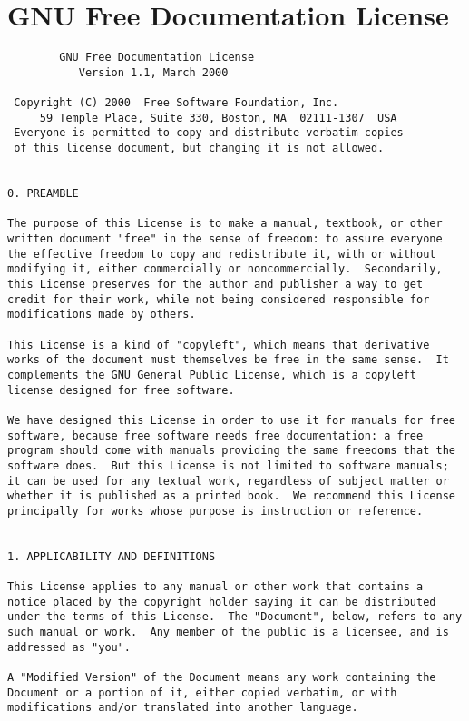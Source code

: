 \documentclass[12pt]{article}
\begin{document}
\newpage

\section{GNU Free Documentation License}

\begin{verbatim}
		GNU Free Documentation License
		   Version 1.1, March 2000

 Copyright (C) 2000  Free Software Foundation, Inc.
     59 Temple Place, Suite 330, Boston, MA  02111-1307  USA
 Everyone is permitted to copy and distribute verbatim copies
 of this license document, but changing it is not allowed.


0. PREAMBLE

The purpose of this License is to make a manual, textbook, or other
written document "free" in the sense of freedom: to assure everyone
the effective freedom to copy and redistribute it, with or without
modifying it, either commercially or noncommercially.  Secondarily,
this License preserves for the author and publisher a way to get
credit for their work, while not being considered responsible for
modifications made by others.

This License is a kind of "copyleft", which means that derivative
works of the document must themselves be free in the same sense.  It
complements the GNU General Public License, which is a copyleft
license designed for free software.

We have designed this License in order to use it for manuals for free
software, because free software needs free documentation: a free
program should come with manuals providing the same freedoms that the
software does.  But this License is not limited to software manuals;
it can be used for any textual work, regardless of subject matter or
whether it is published as a printed book.  We recommend this License
principally for works whose purpose is instruction or reference.


1. APPLICABILITY AND DEFINITIONS

This License applies to any manual or other work that contains a
notice placed by the copyright holder saying it can be distributed
under the terms of this License.  The "Document", below, refers to any
such manual or work.  Any member of the public is a licensee, and is
addressed as "you".

A "Modified Version" of the Document means any work containing the
Document or a portion of it, either copied verbatim, or with
modifications and/or translated into another language.


\end{verbatim}
\end{document}
